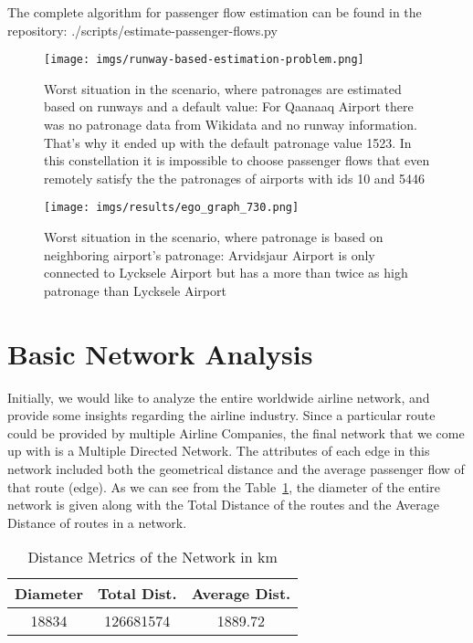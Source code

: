 \documentclass[twocolumn]{tum-article}
\begin{document}
The complete algorithm for passenger flow estimation can be found in the repository: ./scripts/estimate-passenger-flows.py

\begin{figure}[h]
	\centering
	\texttt{[image: imgs/runway-based-estimation-problem.png]}
	\caption{Worst situation in the scenario, where patronages are estimated based on runways and a default value: 
For Qaanaaq Airport there was no patronage data from Wikidata and no runway information. That's why it ended up with the default patronage value 1523. In this constellation it is impossible to choose passenger flows that even remotely satisfy the the patronages of airports with ids 10 and 5446}
	\label{fig:impossible_flows}
\end{figure}

\begin{figure}[h]

	\centering
	\texttt{[image: imgs/results/ego\_graph\_730.png]}
	\caption{Worst situation in the scenario, where patronage is based on neighboring airport's patronage: 
Arvidsjaur Airport is only connected to Lycksele Airport but has a more than twice as high patronage than Lycksele Airport}
	\label{fig:worst_flow_fit}
\end{figure}



\section{Basic Network Analysis}
Initially, we would like to analyze the entire worldwide airline network, and provide some insights regarding the airline industry.
Since a particular route could be provided by multiple Airline Companies, the final network that we come up with is a Multiple Directed Network.
The attributes of each edge in this network included both the geometrical distance and the average passenger flow of that route (edge). 
As we can see from the Table~\ref{Tab:distance_metrics}, the diameter of the entire network is given along with the Total Distance of the routes and the Average Distance of routes in a network.  

\begin{center}
\begin{table}[ht]	
 \begin{tabular}{| c | c | c |}
 \hline
 \textbf{Diameter} & \textbf{Total Dist.} & \textbf{Average Dist.} \\ 
 \hline
 18834 & 126681574 & 1889.72 \\
 \hline
 \end{tabular}
\caption{Distance Metrics of the Network in km}
\label{Tab:distance_metrics}	 
\end{table}
\end{center}
\end{document}
